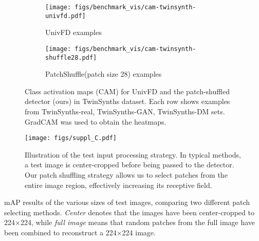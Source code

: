 \begin{figure}[h]
    \centering
    \begin{subfigure}[t]{\linewidth}
        \centering
        \texttt{[image: figs/benchmark\_vis/cam-twinsynth-univfd.pdf]}
        \caption{UnivFD\cite{ojha2023towards} examples}
    \end{subfigure}
    \begin{subfigure}[t]{\linewidth}
        \centering
        \texttt{[image: figs/benchmark\_vis/cam-twinsynth-shuffle28.pdf]}
        \caption{PatchShuffle(patch size 28) examples}
    \end{subfigure}
    \caption{Class activation maps (CAM) for UnivFD\cite{ojha2023towards} and the patch-shuffled detector (ours) in TwinSynths dataset. 
    Each row shows examples from TwinSynths-real, TwinSynths-GAN, TwinSynths-DM sets. 
    GradCAM\cite{selvaraju2020grad,jacobgilpytorchcam} was used to obtain the heatmaps. }
    \label{fig:cam-viz-twinsynth}
\end{figure}

\begin{figure}[t]
    \centering
    \texttt{[image: figs/suppl\_C.pdf]}
    \caption{Illustration of the test input processing strategy. In typical methods, a test image is center-cropped before being passed to the detector. Our patch shuffling strategy allows us to select patches from the entire image region, effectively increasing its receptive field.}
    \label{fig:selecting_patches}
    \vspace{-10pt}
\end{figure}

\begin{table}[t]
    \centering
    \resizebox{\linewidth}{!}{
        
    }
    \caption{mAP results of the various sizes of test images, comparing two different patch selecting methods. \emph{Center} denotes that the images have been center-cropped to 224×224, while \emph{full image} means that random patches from the full image have been combined to reconstruct a 224×224 image.}
    \label{tab:suppl-fullimage}
\end{table}

